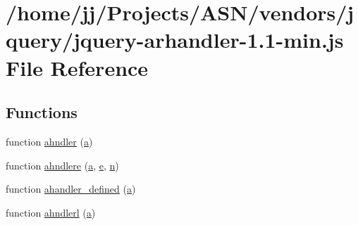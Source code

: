 \hypertarget{jquery-arhandler-1_81-min_8js}{}\section{/home/jj/\+Projects/\+A\+S\+N/vendors/jquery/jquery-\/arhandler-\/1.1-\/min.js File Reference}
\label{jquery-arhandler-1_81-min_8js}
\subsection*{Functions}
\begin{DoxyCompactItemize}
\item 
function \hyperlink{jquery-arhandler-1_81-min_8js_a158d13e9bd9977b6664792a53d09d253}{ahndler} (\hyperlink{_chart_8min_8js_aef3b685c08bc6c76c8e729bd0e93901d}{a})
\item 
function \hyperlink{jquery-arhandler-1_81-min_8js_abb5b8ede18def5e2656dcb7e5bf93d5e}{ahndlere} (\hyperlink{_chart_8min_8js_aef3b685c08bc6c76c8e729bd0e93901d}{a}, \hyperlink{jquery-ui_8min_8js_abea95a4e94bc6f4151d5683d4c12c3f4}{e}, \hyperlink{fullpage_2plugin_8min_8js_ab767a859d1217315f42c9bb52fc648dc}{n})
\item 
function \hyperlink{jquery-arhandler-1_81-min_8js_ad781ee6e734a0dbaab2f49813b96948c}{ahandler\+\_\+defined} (\hyperlink{_chart_8min_8js_aef3b685c08bc6c76c8e729bd0e93901d}{a})
\item 
function \hyperlink{jquery-arhandler-1_81-min_8js_a2731a8d067cffd9fde30c1f0d51a6e48}{ahndlerl} (\hyperlink{_chart_8min_8js_aef3b685c08bc6c76c8e729bd0e93901d}{a})
\item 

\end{DoxyCompactItemize}
